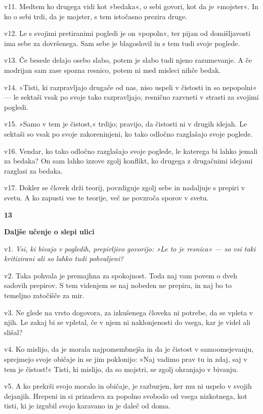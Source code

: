 v11. Medtem ko drugega vidi kot »bedaka«, o sebi govori, kot da je »mojster«. In ko o sebi trdi, da je mojster, s tem istočasno prezira druge.

v12. Le s svojimi pretiranimi pogledi je on »popoln«, ter pijan od domišljavosti ima sebe za dovršenega. Sam sebe je blagoslovil in s tem tudi svoje poglede.

v13. Če besede delajo osebo slabo, potem je slabo tudi njeno razumevanje. A če modrijan sam zase spozna resnico, potem ni med misleci nihče bedak.

v14. »Tisti, ki razpravljajo drugače od nas, niso uspeli v čistosti in so nepopolni« --- le sektaši vsak po svoje tako razpravljajo, resnično razvneti v strasti za svojimi pogledi.

v15. »Samo v tem je čistost,« trdijo; pravijo, da čistosti ni v drugih idejah. Le sektaši so vsak po svoje zakoreninjeni, ko tako odločno razglašajo svoje poglede.

v16. Vendar, ko tako odločno razglašajo svoje poglede, le katerega bi lahko jemali za bedaka? On sam lahko izzove zgolj konflikt, ko drugega z drugačnimi idejami razglasi za bedaka.

v17. Dokler se človek drži teorij, povzdiguje zgolj sebe in nadaljuje s prepiri v svetu. A ko zapusti vse te teorije, več ne povzroča sporov v svetu.

\textbf{13 }

\textbf{Daljše učenje o slepi ulici }

v1. \emph{Vsi, ki bivajo v pogledih, prepirljivo govorijo: »Le to je resnica« ---} \emph{so vsi taki kritizirani ali so lahko tudi pohvaljeni?}

v2. Taka pohvala je premajhna za spokojnost. Toda naj vam povem o dveh sadovih prepirov. S tem videnjem se naj nobeden ne prepira, in naj bo to temeljno zatočišče za mir.

v3. Ne glede na vrsto dogovora, za izkušenega človeka ni potrebe, da se vpleta v njih. Le zakaj bi se vpletal, če v njem ni naklonjenosti do vsega, kar je videl ali slišal?

v4. Ko mislijo, da je morala najpomembnejša in da je čistost v samoomejevanju, sprejmejo svoje običaje in se jim poklonijo: »Naj vadimo prav tu in zdaj, saj v tem je čistost!« Tisti, ki mislijo, da so mojstri, se zgolj ohranjajo v bivanju.

v5. A ko prekrši svojo moralo in običaje, je razburjen, ker mu ni uspelo v svojih dejanjih. Hrepeni in si prizadeva za popolno svobodo od vsega nizkotnega, kot tisti, ki je izgubil svojo karavano in je daleč od doma.

